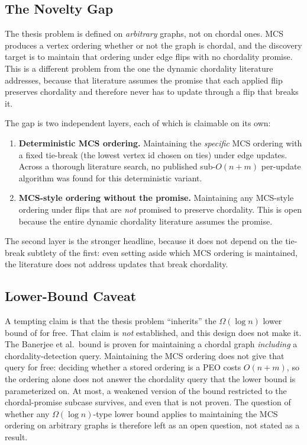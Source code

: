 \documentclass[12pt,a4paper]{article}
\begin{document}
\subsection{The Novelty Gap}

The thesis problem is defined on \emph{arbitrary} graphs, not on chordal ones. MCS produces a vertex ordering whether or not the graph is chordal, and the discovery target is to maintain that ordering under edge flips with no chordality promise. This is a different problem from the one the dynamic chordality literature addresses, because that literature assumes the promise that each applied flip preserves chordality and therefore never has to update through a flip that breaks it.

The gap is two independent layers, each of which is claimable on its own:

\begin{enumerate}[noitemsep]
  \item \textbf{Deterministic MCS ordering.} Maintaining the \emph{specific} MCS ordering with a fixed tie-break (the lowest vertex id chosen on ties) under edge updates. Across a thorough literature search, no published sub-$O(n+m)$ per-update algorithm was found for this deterministic variant.
  \item \textbf{MCS-style ordering without the promise.} Maintaining any MCS-style ordering under flips that are \emph{not} promised to preserve chordality. This is open because the entire dynamic chordality literature assumes the promise.
\end{enumerate}

The second layer is the stronger headline, because it does not depend on the tie-break subtlety of the first: even setting aside which MCS ordering is maintained, the literature does not address updates that break chordality.

\subsection{Lower-Bound Caveat}

A tempting claim is that the thesis problem ``inherits'' the $\Omega(\log n)$ lower bound of \cite{banerjee2018maintaining} for free. That claim is \emph{not} established, and this design does not make it. The Banerjee et al.\ bound is proven for maintaining a chordal graph \emph{including} a chordality-detection query. Maintaining the MCS ordering does not give that query for free: deciding whether a stored ordering is a PEO costs $O(n+m)$, so the ordering alone does not answer the chordality query that the lower bound is parameterized on. At most, a weakened version of the bound restricted to the chordal-promise subcase survives, and even that is not proven. The question of whether any $\Omega(\log n)$-type lower bound applies to maintaining the MCS ordering on arbitrary graphs is therefore left as an open question, not stated as a result.
\end{document}
